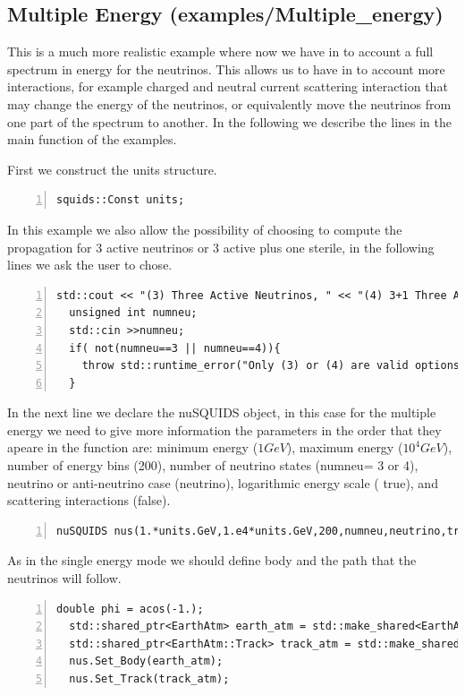 \subsection{Multiple Energy \textnormal{({\ttf examples/Multiple\_energy})}}
This is a much more realistic example where now we have in to account
a full spectrum in energy for the neutrinos. This allows us to have in
to account more interactions, for example charged and neutral current
scattering interaction that may change the energy of the neutrinos, or
equivalently move the neutrinos from one part of the spectrum to
another. In the following we describe the lines in the main function
of the examples.


First we construct the units structure.
\begin{lstlisting}[frame=leftline, numbers = left,breaklines=true, label = ex:sin1,firstnumber=last]
  squids::Const units;
\end{lstlisting}
In this example we also allow the possibility of choosing to compute
the propagation for 3 active neutrinos or 3 active plus one sterile,
in the following lines we ask the user to chose.
\begin{lstlisting}[frame=leftline, numbers = left,breaklines=true, label = ex:sin1,firstnumber=last]
  std::cout << "(3) Three Active Neutrinos, " << "(4) 3+1 Three Active and One Sterile Neutrino" << std::endl;
  unsigned int numneu;
  std::cin >>numneu;
  if( not(numneu==3 || numneu==4)){
    throw std::runtime_error("Only (3) or (4) are valid options");
  }
\end{lstlisting}
In the next line we declare the nuSQUIDS object, in this case for the
multiple energy we need to give more information the parameters in the
order that they apeare in the function are: minimum energy ($1GeV$), maximum
energy ($10^4GeV$), number of energy bins (200), number of neutrino
states ({\ttf numneu}= 3 or 4), neutrino or
anti-neutrino case ({\ttf neutrino}), logarithmic energy scale ({\ttf
  true}), and scattering interactions ({\ttf false}).
\begin{lstlisting}[frame=leftline, numbers = left,breaklines=true,
  label = ex:sin1,firstnumber=last]
  nuSQUIDS nus(1.*units.GeV,1.e4*units.GeV,200,numneu,neutrino,true,false);
\end{lstlisting}
As in the single energy mode we should define body and the path that the
neutrinos will follow.  
\begin{lstlisting}[frame=leftline, numbers = left,breaklines=true,
  label = ex:sin1,firstnumber=last]
  double phi = acos(-1.);
  std::shared_ptr<EarthAtm> earth_atm = std::make_shared<EarthAtm>();
  std::shared_ptr<EarthAtm::Track> track_atm = std::make_shared<EarthAtm::Track>(phi);
  nus.Set_Body(earth_atm);
  nus.Set_Track(track_atm);
\end{lstlisting}
